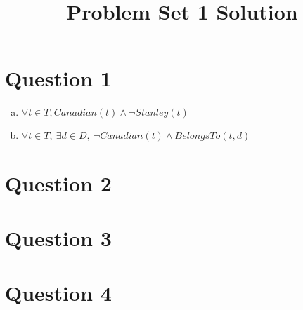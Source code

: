 \documentclass[12pt]{article}
\begin{document}
\title{Problem Set 1 Solution}
\maketitle

\section*{Question 1}
\begin{enumerate}[a.]
    \item $\forall t \in T, Canadian(t) \land \neg Stanley(t)$
    \item $\forall t \in T,\:\exists d \in D,\:\neg Canadian(t) \land BelongsTo(t,d)$
\end{enumerate}

\section*{Question 2}

\section*{Question 3}

\section*{Question 4}
\end{document}
